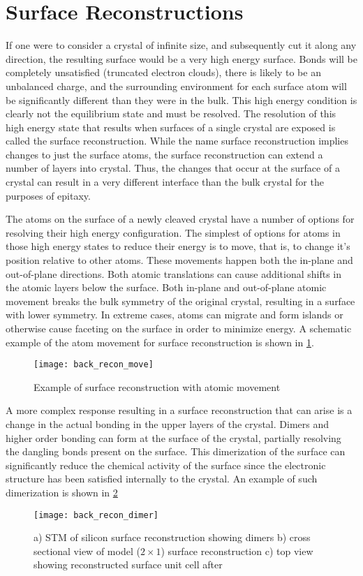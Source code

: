 \section{Surface Reconstructions}\label{sec:reconstruction}
If one were to consider a crystal of infinite size, and subsequently cut it along any direction, the resulting surface would be a very high energy surface. Bonds will be completely unsatisfied (truncated electron clouds), there is likely to be an unbalanced charge, and the surrounding environment for each surface atom will be significantly different than they were in the bulk. This high energy condition is clearly not the equilibrium state and must be resolved. The resolution of this high energy state that results when surfaces of a single crystal are exposed is called the surface reconstruction. While the name surface reconstruction implies changes to just the surface atoms, the surface reconstruction can extend a number of layers into crystal. Thus, the changes that occur at the surface of a crystal can result in a very different interface than the bulk crystal for the purposes of epitaxy.

The atoms on the surface of a newly cleaved crystal have a number of options for resolving their high energy configuration. The simplest of options for atoms in those high energy states to reduce their energy is to move, that is, to change it's position relative to other atoms. These movements happen both the in-plane and out-of-plane directions. Both atomic translations can cause additional shifts in the atomic layers below the surface.  Both in-plane and out-of-plane atomic movement breaks the bulk symmetry of the original crystal, resulting in a surface with lower symmetry. In extreme cases, atoms can migrate and form islands or otherwise cause faceting on the surface in order to minimize energy. A schematic example of the atom movement for surface reconstruction is shown in \cref{fig:back_recon_move}.
\begin{figure}
    \centering
    \texttt{[image: back\_recon\_move]}
    \caption[Simple surface reconstruction]{\label{fig:back_recon_move}Example of surface reconstruction with atomic movement\cite{ohring2001materials}}
\end{figure}

A more complex response resulting in a surface reconstruction that can arise is a change in the actual bonding in the upper layers of the crystal. Dimers and higher order bonding can form at the surface of the crystal, partially resolving the dangling bonds present on the surface. This dimerization of the surface can significantly reduce the chemical activity of the surface since the electronic structure has been satisfied internally to the crystal. An example of such dimerization is shown in \cref{fig:back_recon_dimer}
\begin{figure}
    \centering
    \texttt{[image: back\_recon\_dimer]}
    \caption[Silicon dimer surface reconstruction]{\label{fig:back_recon_dimer}a) STM of silicon surface reconstruction showing dimers b) cross sectional view of model ($2 \times 1$) surface reconstruction c) top view showing reconstructed surface unit cell after \cite{Zhang1997}} 
\end{figure}

